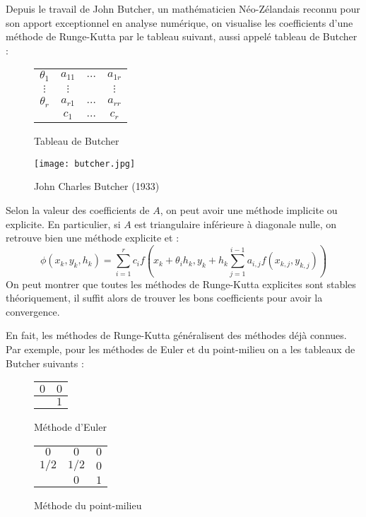 \documentclass[a4paper, titlepage]{livret} %
\begin{document}
				Depuis le travail de John Butcher, un mathématicien Néo-Zélandais reconnu pour son apport exceptionnel en analyse numérique, on visualise les coefficients d'une méthode de Runge-Kutta par le tableau suivant, aussi appelé tableau de Butcher :
				\begin{figure}[!h]
 					\begin{minipage}[b]{.45\linewidth}
 						\centering
 							\begin{tabular}{c|ccc}
								$\theta_1$ & $a_{11}$ & $\ldots$ & $a_{1r}$\\
								$\vdots$ & $\vdots$ & & $\vdots$ \\
								$\theta_r$ & $a_{r1}$ & $\ldots$ & $a_{rr}$\\
								\hline
								&$c_1$ & $\ldots$ & $c_r$
							\end{tabular}
 							\caption{Tableau de Butcher}
 					\end{minipage} \hfill
 					\begin{minipage}[b]{.45\linewidth}
 						\centering
 							\texttt{[image: butcher.jpg]}
 							\caption{John Charles Butcher (1933)}
 					\end{minipage}
				\end{figure}

				Selon la valeur des coefficients de $A$, on peut avoir une méthode implicite ou explicite.
				En particulier, si $A$ est triangulaire inférieure à diagonale nulle, on retrouve bien une méthode explicite et :
				\[
					\phi(x_{k}, y_{k}, h_{k}) = \sum_{i = 1}^{r} c_{i}f\left(x_{k} + \theta_{i}h_{k}, y_{k} + h_{k}\sum_{j = 1}^{i - 1} a_{i,j}f(x_{k,j},y_{k,j})\right)
				\]
				On peut montrer que toutes les méthodes de Runge-Kutta explicites sont stables théoriquement, il suffit alors de trouver les bons coefficients pour avoir la convergence.

				En fait, les méthodes de Runge-Kutta généralisent des méthodes déjà connues.
				Par exemple, pour les méthodes de Euler et du point-milieu on a les tableaux de Butcher suivants :
				\begin{figure}[!h]
 					\begin{minipage}[b]{.45\linewidth}
 						\centering
 							\begin{tabular}{c|c}
								$0$ & $0$\\
								\hline
								&$1$
							\end{tabular}
 							\caption{Méthode d'Euler}
 					\end{minipage} \hfill
 					\begin{minipage}[b]{.45\linewidth}
 						\centering
 							\begin{tabular}{c|cc}
 								$0$ & $0$ & $0$\\
								$1/2$ & $1/2$ & $0$\\
								\hline
								&$0$ & $1$
							\end{tabular}
 							\caption{Méthode du point-milieu}
 					\end{minipage}
				\end{figure}
\end{document}
